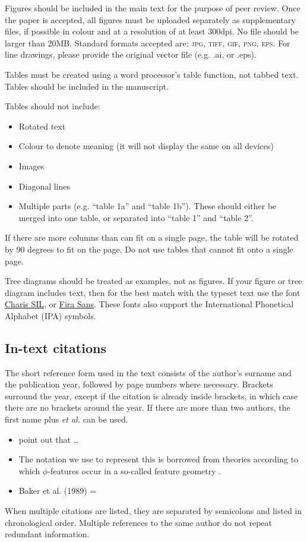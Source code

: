 \documentclass[charis,linguex,biblatex]{glossa}
\begin{document}
Figures should be included in the main text for the purpose of peer review. Once the paper is accepted, all figures must be uploaded separately as supplementary files, if possible in colour and at a resolution of at least 300dpi. No file should be larger than 20MB. Standard formats accepted are: \textsc{jpg, tiff, gif, png, eps}. For line drawings, please provide the original vector file (e.g. .ai, or .eps).

Tables must be created using a word processor's table function, not tabbed text. Tables should be included in the manuscript. 

Tables should not include:

\begin{itemize}
\item Rotated text
\item Colour to denote meaning (it will not display the same on all devices)
\item Images
\item Diagonal lines
\item Multiple parts (e.g. ``table 1a'' and ``table 1b''). These should either be merged into one table, or separated into ``table 1'' and ``table 2''.
\end{itemize}
If there are more columns than can fit on a single page, the table will be rotated by 90 degrees to fit on the page. Do not use tables that cannot fit onto a single page.

Tree diagrams should be treated as examples, not as figures. If your figure or tree diagram includes text, then for the best match with the typeset text use the font \href{https://software.sil.org/charis/download/}{Charis SIL}, or \href{https://www.fontsquirrel.com/fonts/fira-sans}{Fira Sans}. These fonts also support the International Phonetical Alphabet (IPA) symbols.


\subsection{In-text citations}

The short reference form used in the text consists of the author’s surname and the publication year, followed by page numbers where necessary. Brackets surround the year, except if the citation is already inside brackets, in which case there are no brackets around the year. If there are more than two authors, the first name plus \textit{et al.} can be used.

\begin{itemize}
\item \citet[514]{murray:1983} point out that \ldots
\item The notation we use to represent this is borrowed from theories according to which $\phi$-features occur in a so-called feature geometry \citep[248-250]{mccarthy:1999}.
\item Baker et al. (1989) = \citet*{baker:1989}
\end{itemize}
When multiple citations are listed, they are separated by semicolons and listed in chronological order. Multiple references to the same author do not repeat redundant information.
\end{document}
